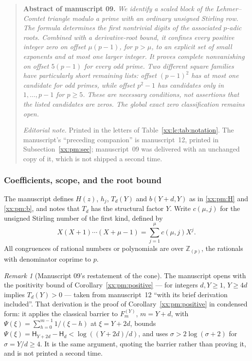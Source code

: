 \documentclass[11pt,a4paper]{article}
\numberwithin{equation}{section}
\theoremstyle{definition}
\theoremstyle{remark}
\newtheorem{remark}[theorem]{Remark}
\theoremstyle{plain}
\newcommand{\Z}{\mathbb Z}
\begin{document}
\begin{quote}\small
\textbf{Abstract of manuscript 09.}\itshape
We identify a scaled block of the Lehmer--Comtet triangle modulo a prime with
an ordinary unsigned Stirling row. The formula determines the first nontrivial
digits of the associated $p$-adic roots. Combined with a derivative-root bound,
it confines every positive integer zero on offset $\mu(p-1)$, for $p>\mu$, to
an explicit set of small exponents and at most one larger integer. It proves
complete nonvanishing on offset $5(p-1)$ for every odd prime. Two different
square families have particularly short remaining lists: offset $(p-1)^2$ has
at most one candidate for odd primes, while offset $p^2-1$ has candidates only
in $1,\ldots,p-1$ for $p\ge5$. These are necessary conditions, not assertions
that the listed candidates are zeros. The global exact zero classification
remains open.
\upshape\par
\smallskip
\emph{Editorial note.}  Printed in the letters of
Table~\ref{xx:lc:tab:notation}.  The manuscript's ``preceding companion'' is
manuscript~12, printed in Subsection~\ref{xx:pm:sec}; manuscript~09 was
delivered with an unchanged copy of it, which is not shipped a second time.
\end{quote}

\subsubsection{Coefficients, scope, and the root bound}

The manuscript defines $H(z)$, $h_j$, $T_d(Y)$ and $b(Y+d,Y)$ as in
\eqref{xx:pm:H} and \eqref{xx:pm:b}, and notes that $T_d$ has the structural
factor $Y$.  Write $c(\mu,j)$ for the unsigned Stirling number of the first
kind, defined by
\[
 X(X+1)\cdots(X+\mu-1)=\sum_{j=1}^\mu c(\mu,j)X^j.
\]
All congruences of rational numbers or polynomials are over $\Z_{(p)}$, the
rationals with denominator coprime to $p$.

\begin{remark}[Manuscript 09's restatement of the cone]\label{xx:st:cone}
The manuscript opens with the positivity bound of
Corollary~\ref{xx:pm:positive} --- for integers $d,Y\ge1$, $Y\ge4d$ implies
$T_d(Y)>0$ --- taken from manuscript~12 ``with its brief derivation included''.
That derivation is the proof of Corollary~\ref{xx:pm:positive} in condensed
form: it applies the classical barrier \cite[Theorem~1.4]{xx-ravichandran} to
$F_m^{(Y)}$, $m=Y+d$, with $\Psi(\xi)=\sum_{h=0}^{m-1}1/(\xi-h)$ at
$\xi=Y+2d$, bounds $\Psi(\xi)=\mathsf H_{Y+2d}-\mathsf H_d<\log((Y+2d)/d)$,
and uses $\sigma>2\log(\sigma+2)$ for $\sigma=Y/d\ge4$.  It is the same
argument, quoting the barrier rather than proving it, and is not printed a
second time.
\end{remark}
\end{document}
